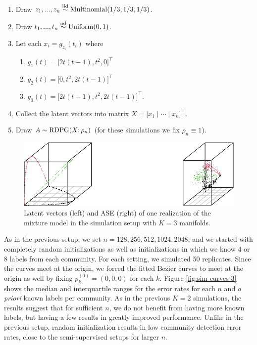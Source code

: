 \documentclass[
  12pt,
]{article}
\providecommand{\tightlist}{%
  \setlength{\itemsep}{0pt}\setlength{\parskip}{0pt}}
\theoremstyle{definition}
\theoremstyle{definition}
\theoremstyle{definition}
\theoremstyle{definition}
\theoremstyle{remark}
\begin{document}
\begin{enumerate}
\def\labelenumi{\arabic{enumi}.}
\tightlist
\item
  Draw \(z_1, ..., z_n \stackrel{\mathrm{iid}}{\sim} \mathrm{Multinomial}(1/3, 1/3, 1/3)\).
\item
  Draw \(t_1, ..., t_n \stackrel{\mathrm{iid}}{\sim} \mathrm{Uniform}(0, 1)\).
\item
  Let each \(x_i = g_{z_i}(t_i)\) where

  \begin{enumerate}
  \def\labelenumii{\roman{enumii}.}
  \tightlist
  \item
    \(g_1(t) = \Big[ 2 t (t-1), t^2, 0 \Big]^\top\)
  \item
    \(g_2(t) = \Big[ 0, t^2, 2 t (t-1) \Big]^\top\)
  \item
    \(g_3(t) = \Big[2 t (t-1), t^2, 2 t (t-1) \Big]^\top\).
  \end{enumerate}
\item
  Collect the latent vectors into matrix \(X = \Big[ x_1 \mid \cdots \mid x_n \Big]^\top\).
\item
  Draw \(A \sim \mathrm{RDPG}(X; \rho_n)\) (for these simulations we fix \(\rho_n \equiv 1\)).
\end{enumerate}

\begin{figure}[H]

{\centering \includegraphics{draft_files/figure-latex/three-curves-1} 

}

\caption{Latent vectors (left) and ASE (right) of one realization of the mixture model in the simulation setup with $K=3$ manifolds.}\label{fig:three-curves}
\end{figure}

As in the previous setup, we set \(n = 128, 256, 512, 1024, 2048\), and we started with completely random initializations as well as initializations in which we know \(4\) or \(8\) labels from each community.
For each setting, we simulated 50 replicates.
Since the curves meet at the origin, we forced the fitted Bezier curves to meet at the origin as well by fixing \(p_k^{(0)} = (0, 0, 0)\) for each \(k\).
Figure \ref{fig:sim-curves-3} shows the median and interquartile ranges for the error rates for each \(n\) and \emph{a priori} known labels per community.
As in the previous \(K = 2\) simulations, the results suggest that for sufficient \(n\), we do not benefit from having more known labels, but having a few results in greatly improved performance. Unlike in the previous setup, random initialization results in low community detection error rates, close to the semi-supervised setups for larger \(n\).
\end{document}
